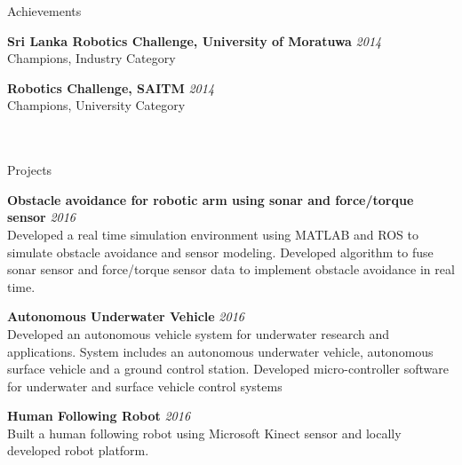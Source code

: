 \documentclass[
11pt, %
]{./assets/resume} %
\begin{document}
\begin{rSection}{Achievements}

	\textbf{Sri Lanka Robotics Challenge, University of Moratuwa} \hfill \textit{2014}\\
	Champions, Industry Category

	\textbf{Robotics Challenge, SAITM} \hfill \textit{2014}\\
	Champions, University Category
	\\
	\\
	\\

\end{rSection}




\begin{rSection}{Projects}

	\textbf{Obstacle avoidance for robotic arm using sonar and force/torque sensor} \hfill \textit{2016}\\
	Developed a real time simulation environment using MATLAB and ROS to simulate obstacle avoidance and sensor modeling.
    Developed algorithm to fuse sonar sensor and force/torque sensor data to implement obstacle avoidance in real time.

	
	\textbf{Autonomous Underwater Vehicle} \hfill \textit{2016}\\
	Developed an autonomous vehicle system for underwater research and applications. System includes an autonomous underwater vehicle, autonomous surface vehicle and a ground control station.
    Developed micro-controller software for underwater and surface vehicle control systems

	\textbf{Human Following Robot } \hfill \textit{2016}\\
	Built a human following robot using Microsoft Kinect sensor and locally developed robot platform.

\end{rSection}
\end{document}
